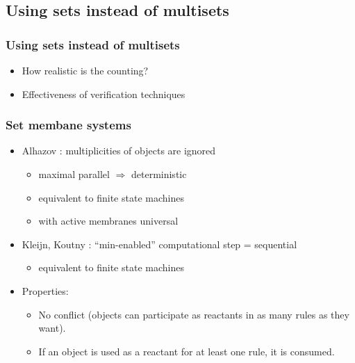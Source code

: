 
  \subsection{Using sets instead of multisets} %
  \label{sub:using_sets_instead_of_multisets}
    
    \begin{frame}[t]\frametitle{Using sets instead of multisets}
      \begin{itemize}
        \item How realistic is the counting?
        \item Effectiveness of verification techniques
      \end{itemize}
      
    \end{frame}
    \note{}

    \begin{frame}[t]\frametitle{Set membane systems}
      \begin{itemize}
        \item Alhazov \cite{Alhazov05WithoutMultiplicities}: multiplicities of objects are ignored
        \pause
        \begin{itemize}
          \item maximal parallel $\Rightarrow$ deterministic
          \pause
          \item equivalent to finite state machines
          \pause
          \item with active membranes universal
        \end{itemize}
        \pause
        \item Kleijn, Koutny \cite{Kleijn11SetMembrane}: ``min-enabled'' computational step = sequential
        \pause
        \begin{itemize}
          \item equivalent to finite state machines
        \end{itemize}        
        \pause
        \item Properties:
        \begin{itemize}
          \item No conflict (objects can participate as reactants in as many rules as they want).
          \item If an object is used as a reactant for at least one rule, it is consumed.
        \end{itemize}
      \end{itemize}
    \end{frame}
    \note{}

